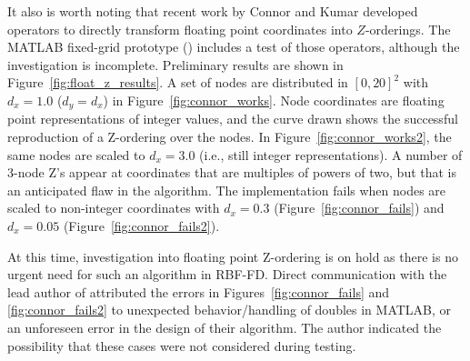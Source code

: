 \documentclass{report}
\begin{document}
It also is worth noting that recent work by Connor and Kumar \cite{Connor2009} developed operators to directly transform floating point coordinates into $Z$-orderings. The MATLAB fixed-grid prototype (\cite{BolligRBFFixedGrid}) includes a test of those operators, although the investigation is incomplete. Preliminary results are shown in Figure~\ref{fig:float_z_results}. A set of nodes are distributed in $[0,20]^2$ with $d_x = 1.0$ ($d_y = d_x$) in Figure~\ref{fig:connor_works}. Node coordinates are floating point representations of integer values, and the curve drawn shows the successful reproduction of a Z-ordering over the nodes. In Figure~\ref{fig:connor_works2}, the same nodes are scaled to $d_x = 3.0$ (i.e., still integer representations). A number of 3-node Z's appear at coordinates that are multiples of powers of two, but that  is an anticipated flaw in the algorithm. The implementation fails when nodes are scaled to non-integer coordinates with $d_x = 0.3$ (Figure~\ref{fig:connor_fails}) and $d_x=0.05$ (Figure~\ref{fig:connor_fails2}). 

At this time, investigation into floating point Z-ordering is on hold as there is no urgent need for such an algorithm in RBF-FD. Direct communication with the lead author of \cite{Connor2009} attributed the errors in Figures~\ref{fig:connor_fails} and \ref{fig:connor_fails2} to unexpected behavior/handling of doubles in MATLAB, or an unforeseen error in the design of their algorithm. The author indicated the possibility that these cases were not considered during testing.
\end{document}
